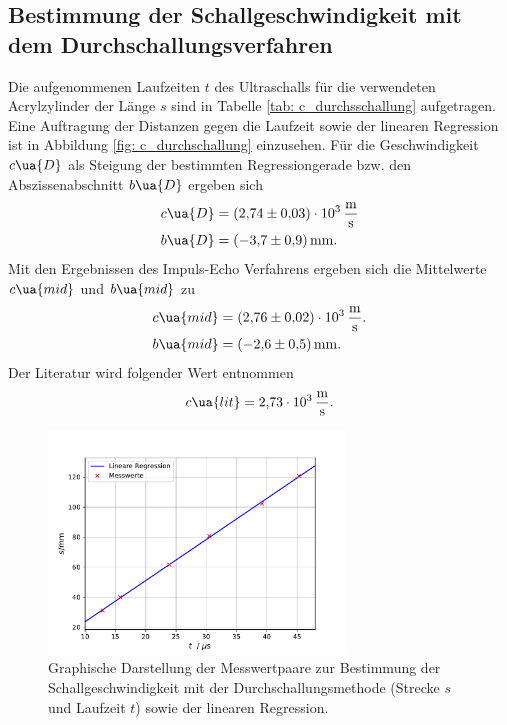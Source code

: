 \subsection{Bestimmung der Schallgeschwindigkeit mit dem Durchschallungsverfahren}
Die aufgenommenen Laufzeiten $t$ des Ultraschalls für die verwendeten Acrylzylinder der Länge $s$ sind
in Tabelle \ref{tab: c_durchsschallung} aufgetragen. Eine Auftragung der Distanzen gegen die Laufzeit sowie
der linearen Regression ist in Abbildung \ref{fig: c_durchschallung} einzusehen. Für die Geschwindigkeit $c\ua{D}$ %
als Steigung der bestimmten Regressiongerade bzw. den Abszissenabschnitt $b\ua{D}$ ergeben sich
\begin{align}
  \begin{aligned}
    c\ua{D} &= \SI{+2.74(3)e+03}{\meter\per\second}\\
    b\ua{D} &= \SI{-3.7(9)}{\milli\meter}.
  \end{aligned}
\end{align}
Mit den Ergebnissen des Impuls-Echo Verfahrens ergeben sich die Mittelwerte $c\ua{mid}$ und $b\ua{mid}$ zu
\begin{align}
  \begin{aligned}
  c\ua{mid} &= \SI{+2.76(2)e+03}{\meter\per\second}. \\
  b\ua{mid} &= \SI{-2.6(5)}{\milli\meter}.
\end{aligned}
\end{align}
Der Literatur \cite{olympus} wird folgender Wert entnommen
\begin{equation}
  c\ua{lit} = \SI{2.73e3}{\meter\per\second}.
  \label{eq: c_lit}
\end{equation}


\begin{figure}[H]
  \centering
  \includegraphics[width = 0.7\textwidth]{../Messdaten/plots/schallgeschwindigkeit_durchschallung.pdf}
  \caption{Graphische Darstellung der Messwertpaare zur Bestimmung der Schallgeschwindigkeit
  mit der Durchschallungsmethode (Strecke $s$ und Laufzeit $t$) sowie der linearen Regression.}
  \label{fig: c_durchsschallung}
\end{figure}


